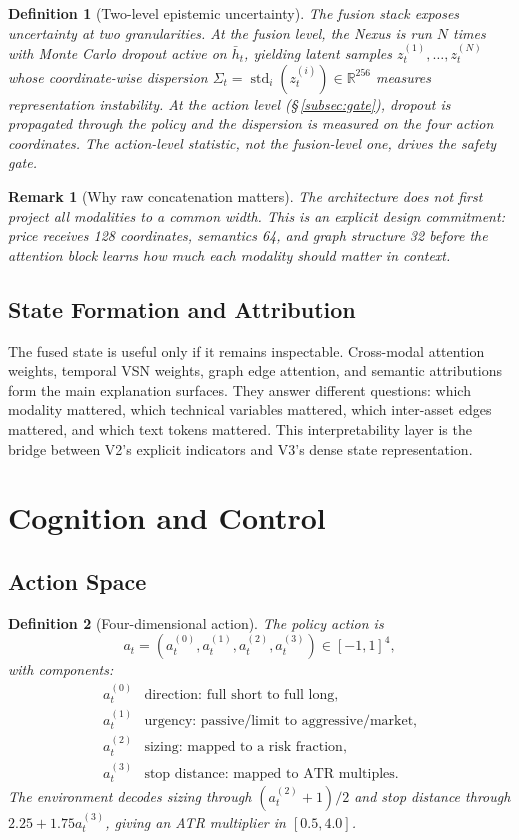 \documentclass[10pt]{article}
\newtheorem{definition}{Definition}[section]
\newtheorem{remark}{Remark}[section]
\newcommand{\R}{\mathbb{R}}
\newcommand{\std}{\operatorname{std}}
\begin{document}
\begin{definition}[Two-level epistemic uncertainty]
	The fusion stack exposes uncertainty at two granularities. At the \emph{fusion} level, the
	Nexus is run \(N\) times with Monte Carlo dropout active on \(\bar h_t\), yielding latent
	samples \(z_t^{(1)},\ldots,z_t^{(N)}\) whose coordinate-wise dispersion
	\(\Sigma_t=\std_i(z_t^{(i)})\in\R^{256}\) measures representation instability. At the
	\emph{action} level (\S\,\ref{subsec:gate}), dropout is propagated through the policy and the
	dispersion is measured on the four action coordinates. The action-level statistic, not the
	fusion-level one, drives the safety gate.
\end{definition}

\begin{remark}[Why raw concatenation matters]
	The architecture does not first project all modalities to a common width. This is an explicit
	design commitment: price receives 128 coordinates, semantics 64, and graph structure 32
	before the attention block learns how much each modality should matter in context.
\end{remark}

\subsection{State Formation and Attribution}

The fused state is useful only if it remains inspectable. Cross-modal attention weights,
temporal VSN weights, graph edge attention, and semantic attributions form the main
explanation surfaces. They answer different questions: which modality mattered, which
technical variables mattered, which inter-asset edges mattered, and which text tokens mattered.
This interpretability layer is the bridge between V2's explicit indicators and V3's dense
state representation.

\section{Cognition and Control}

\subsection{Action Space}

\begin{definition}[Four-dimensional action]
	The policy action is
	\[
		a_t=(a_t^{(0)},a_t^{(1)},a_t^{(2)},a_t^{(3)})\in[-1,1]^4,
	\]
	with components:
	\[
		\begin{array}{ll}
			a_t^{(0)} & \text{direction: full short to full long},          \\
			a_t^{(1)} & \text{urgency: passive/limit to aggressive/market}, \\
			a_t^{(2)} & \text{sizing: mapped to a risk fraction},           \\
			a_t^{(3)} & \text{stop distance: mapped to ATR multiples}.
		\end{array}
	\]
	The environment decodes sizing through \((a_t^{(2)}+1)/2\) and stop distance through
	\(2.25+1.75a_t^{(3)}\), giving an ATR multiplier in \([0.5,4.0]\).
\end{definition}
\end{document}

